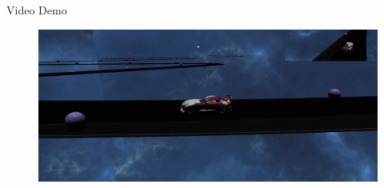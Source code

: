 \documentclass[final]{beamer}
\newlength{\onecolwid}
\begin{document}
\begin{frame}[t]
\begin{columns}[t]
\begin{column}{\onecolwid}
\begin{block}{Video Demo}
\ 

\begin{figure}[bH]
\includegraphics[width=\textwidth]{running.png}
\end{figure}

\end{block}








\end{column} %

\end{columns} %

\end{frame} %
\end{document}
